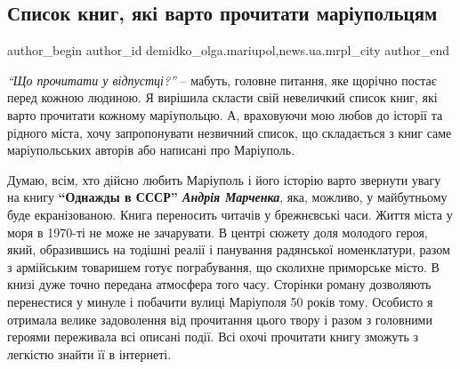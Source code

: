  
 
 
 
 
 
\subsection{Список книг, які варто прочитати маріупольцям}
\label{sec:17_08_2020.stz.news.ua.mrpl_city.1.spisok_knig}
 
\ifcmt
 author_begin
   author_id demidko_olga.mariupol,news.ua.mrpl_city
 author_end
\fi

\emph{\enquote{Що прочитати у відпустці?}} – мабуть, головне питання, яке щорічно постає перед
кожною людиною. Я вирішила скласти свій невеличкий список книг, які варто
прочитати кожному маріупольцю. А, враховуючи мою любов до історії та рідного
міста, хочу запропонувати незвичний список, що складається з книг саме
маріупольських авторів або написані про Маріуполь.


Думаю, всім, хто дійсно любить Маріуполь і його історію варто звернути увагу на
книгу \textbf{\enquote{Однажды в СССР} \emph{Андрія Марченка}}, яка, можливо, у майбутньому буде
екранізованою. Книга переносить читачів у брежнєвські часи. Життя міста у моря
в 1970-ті не може не зачарувати. В центрі сюжету доля молодого героя, який,
образившись на тодішні реалії і панування радянської номенклатури, разом з
армійським товаришем готує пограбування, що сколихне приморське місто. В книзі
дуже точно передана атмосфера того часу. Сторінки роману дозволяють перенестися
у минуле і побачити вулиці Маріуполя 50 років тому. Особисто я отримала велике
задоволення від прочитання цього твору і разом з головними героями переживала
всі описані події. Всі охочі прочитати книгу зможуть з легкістю знайти її в
інтернеті.


